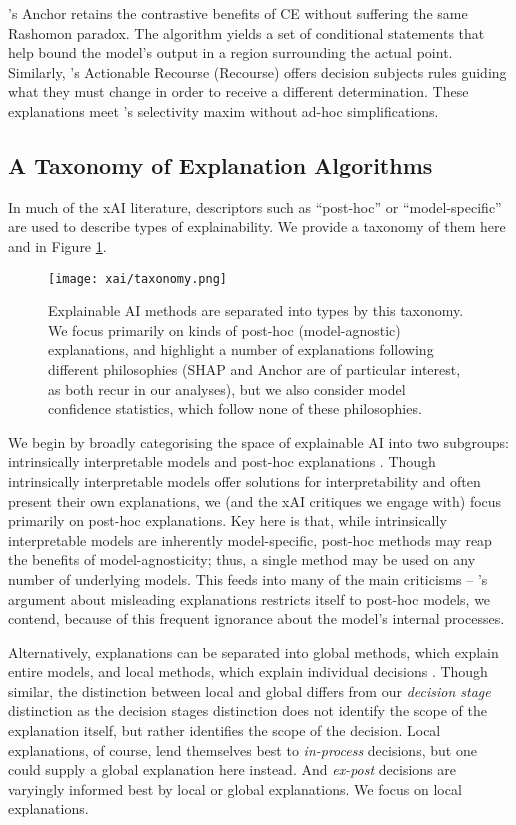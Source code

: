 \textcite{ribeiro_anchors_2018}'s Anchor retains the contrastive benefits of CE without suffering the same Rashomon paradox. The algorithm yields a set of conditional statements that help bound the model's output in a region surrounding the actual point. Similarly, \textcite{ustun_actionable_2019}'s Actionable Recourse (Recourse) offers decision subjects rules guiding what they must change in order to receive a different determination. These explanations meet \textcite{miller_explanation_2017}'s selectivity maxim without ad-hoc simplifications.

\subsection{A Taxonomy of Explanation Algorithms}
In much of the xAI literature, descriptors such as ``post-hoc'' or ``model-specific'' are used to describe types of explainability. We provide a taxonomy of them here and in Figure \ref{fig:taxonomy}.

\begin{figure}[htbp]
    \centering
    \texttt{[image: xai/taxonomy.png]}
    \caption{Explainable AI methods are separated into types by this taxonomy. We focus primarily on kinds of post-hoc (model-agnostic) explanations, and highlight a number of explanations following different philosophies (SHAP and Anchor are of particular interest, as both recur in our analyses), but we also consider model confidence statistics, which follow none of these philosophies.}
    \label{fig:taxonomy}
\end{figure}

We begin by broadly categorising the space of explainable AI into two subgroups: intrinsically interpretable models and post-hoc explanations \cite{molnar_interpretable_2019}. Though intrinsically interpretable models offer solutions for interpretability and often present their own explanations, we (and the xAI critiques we engage with) focus primarily on post-hoc explanations. Key here is that, while intrinsically interpretable models are inherently model-specific, post-hoc methods may reap the benefits of model-agnosticity; thus, a single method may be used on any number of underlying models. This feeds into many of the main criticisms – \textcite{Lipton}'s argument about misleading explanations restricts itself to post-hoc models, we contend, because of this frequent ignorance about the model's internal processes.

Alternatively, explanations can be separated into global methods, which explain entire models, and local methods, which explain individual decisions \cite{molnar_interpretable_2019}. Though similar, the distinction between local and global differs from our \emph{decision stage} distinction as the decision stages distinction does not identify the scope of the explanation itself, but rather identifies the scope of the decision. Local explanations, of course, lend themselves best to \emph{in-process} decisions, but one could supply a global explanation here instead. And \emph{ex-post} decisions are varyingly informed best by local or global explanations. We focus on local explanations.

